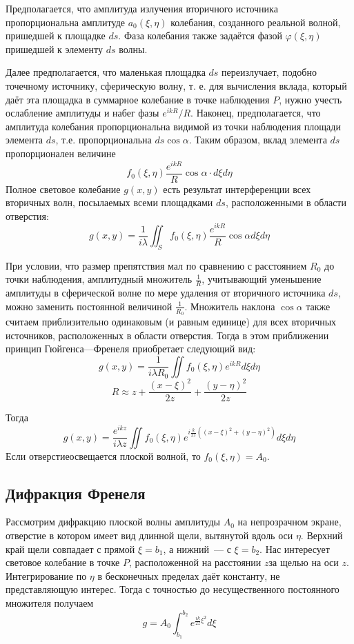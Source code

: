 Предполагается, что амплитуда излучения вторичного источника пропорциональна амплитуде $a_{0}(\xi, \eta)$  колебания, созданного реальной волной, пришедшей к площадке $ds$. Фаза колебания также задаётся фазой $ \varphi( \xi, \eta)$ пришедшей к элементу $ds$ волны.

Далее предполагается, что маленькая площадка $ds$ переизлучает, подобно точечному источнику, сферическую волну, т. е. для вычисления вклада, который даёт эта площадка в суммарное колебание в точке наблюдения $P$,  нужно учесть ослабление амплитуды и набег фазы $e^{ikR}/R$. Наконец, предполагается, что амплитуда колебания пропорциональна видимой из точки наблюдения площади элемента $ds$, т.е. пропорциональна $ds\cos\alpha$. Таким образом, вклад элемента $ds$ пропорционален величине
\[
    f_{0}(\xi, \eta)\frac{e^{ikR}}{R}\cos\alpha\cdot d\xi d\eta
\]
Полное световое колебание $g(x, y)$ есть результат интерференции всех вторичных волн, посылаемых всеми площадками $ds$, расположенными в области отверстия:
\[
    g(x, y) = \frac{1}{i\lambda}\iint_{S} f_{0}(\xi, \eta)\frac{e^{ikR}}{R}\cos\alpha d\xi d\eta
\]

При условии, что размер препятствия мал по сравнению с расстоянием $R_{0}$ до точки наблюдения, амплитудный множитель $\frac{1}{R}$,  учитывающий уменьшение амплитуды в сферической волне по мере удаления от вторичного источника $ds$, можно заменить постоянной величиной $\frac{1}{R_{0}}$. Множитель наклона $\cos\alpha$ также считаем приблизительно одинаковым (и равным единице) для всех вторичных источников, расположенных в области отверстия. Тогда в этом приближении принцип Гюйгенса—Френеля приобретает следующий вид:
\[
    g(x, y) = \frac{1}{i\lambda R_{0}} \iint f_{0}(\xi, \eta)e^{ikR} d\xi d\eta
\]
\[
    R \approx z + \frac{\left(x - \xi\right)^{2}}{2z} + \frac{\left(y - \eta\right)^{2}}{2z}
\]

Тогда
\[
    g(x, y) = \frac{e^{ikz}}{i \lambda z}\iint f_{0}(\xi, \eta)e^{i\frac{k}{2z}\left(\left(x-\xi\right)^{2} + \left(y - \eta\right)^{2}\right)} d\xi d\eta
\]
Если отверстиеосвещается плоской волной, то $f_{0}(\xi, \eta) = A_{0}$.

\subsection{Дифракция Френеля}

Рассмотрим дифракцию плоской волны амплитуды $A_{0}$ на непрозрачном экране, отверстие в котором имеет вид длинной щели, вытянутой вдоль оси $\eta$. Верхний край щели совпадает с прямой $\xi = b_{1}$, а нижний~--- с $\xi = b_{2}$. Нас интересует световое колебание в точке $P$, расположенной на расстоянии $z$за щелью на оси $z$. Интегрирование по $\eta$ в бесконечных пределах даёт константу, не представляющую интерес. Тогда с точностью до несущественного постоянного множителя получаем
\[
    g = A_{0} \int_{b_{1}}^{b_{2}} e^{\frac{ik}{2z}\xi^{2}}d\xi
\]

